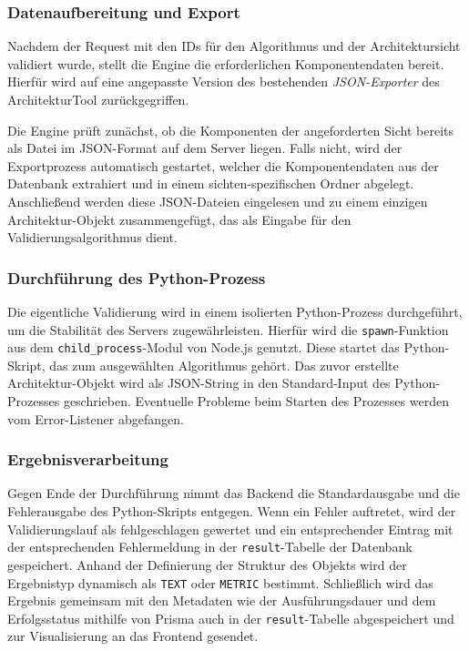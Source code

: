 \subsubsection*{Datenaufbereitung und Export}

Nachdem der Request mit den IDs für den Algorithmus und der Architektursicht validiert wurde, stellt die Engine die erforderlichen Komponentendaten bereit. Hierfür wird auf eine angepasste Version des bestehenden \textit{JSON-Exporter} des ArchitekturTool zurückgegriffen.

Die Engine prüft zunächst, ob die Komponenten der angeforderten Sicht bereits als Datei im JSON-Format auf dem Server liegen. Falls nicht, wird der Exportprozess automatisch gestartet, welcher die Komponentendaten aus der Datenbank extrahiert und in einem sichten-spezifischen Ordner abgelegt. Anschließend werden diese JSON-Dateien eingelesen und zu einem einzigen Architektur-Objekt zusammengefügt, das als Eingabe für den Validierungsalgorithmus dient.

\subsubsection*{Durchführung des Python-Prozess}

Die eigentliche Validierung wird in einem isolierten Python-Prozess durchgeführt, um die Stabilität des Servers zugewährleisten. Hierfür wird die \texttt{spawn}-Funktion aus dem \texttt{child\_process}-Modul von Node.js genutzt. Diese startet das Python-Skript, das zum ausgewählten Algorithmus gehört. Das zuvor erstellte Architektur-Objekt wird als JSON-String in den Standard-Input des Python-Prozesses geschrieben. Eventuelle Probleme beim Starten des Prozesses werden vom Error-Listener abgefangen.

\subsubsection*{Ergebnisverarbeitung}

Gegen Ende der Durchführung nimmt das Backend die Standardausgabe und die Fehlerausgabe des Python-Skripts entgegen. Wenn ein Fehler auftretet, wird der Validierungslauf als fehlgeschlagen gewertet und ein entsprechender Eintrag mit der entsprechenden Fehlermeldung in der \texttt{result}-Tabelle der Datenbank gespeichert. Anhand der Definierung der Struktur des Objekts wird der Ergebnistyp dynamisch als \texttt{TEXT} oder \texttt{METRIC} bestimmt. Schließlich wird das Ergebnis gemeinsam mit den Metadaten wie der Ausführungsdauer und dem Erfolgsstatus mithilfe von Prisma auch in der \texttt{result}-Tabelle abgespeichert und zur Visualisierung an das Frontend gesendet.

